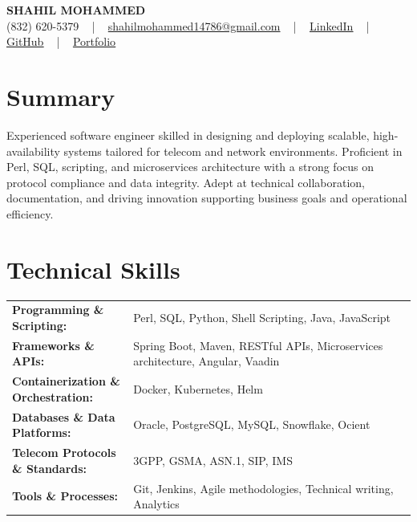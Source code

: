 \documentclass[letterpaper,11pt]{article}
\begin{document}
\begin{center}
    {\fontsize{14pt}{12pt}\selectfont \textbf{\MakeUppercase{Shahil Mohammed}}}\\ \vspace{2pt}
    \fontsize{10pt}{12pt}\selectfont (832) 620-5379 ~ | ~ \href{mailto:shahilmohammed14786@gmail.com}{shahilmohammed14786@gmail.com} ~ | ~  
    \href{https://www.linkedin.com/in/shahil-mohammed-9652931a1/}{\color{blue}\underline{LinkedIn}}  ~ | ~ 
    \href{https://github.com/freakbeast14}{\color{blue}\underline{GitHub}} ~ | ~ 
    \href{https://shahil-mohammed.netlify.app/}{\color{blue}\underline{Portfolio}}
    \vspace{-8pt}
\end{center}

\section{Summary}
\fontsize{9pt}{10pt}\selectfont
Experienced software engineer skilled in designing and deploying scalable, high-availability systems tailored for telecom and network environments. Proficient in Perl, SQL, scripting, and microservices architecture with a strong focus on protocol compliance and data integrity. Adept at technical collaboration, documentation, and driving innovation supporting business goals and operational efficiency.
 \vspace{-5pt}
 
\section{Technical Skills}
        \vspace{-14pt}
        \begin{table}[h]
            \fontsize{9pt}{10pt}\selectfont
            \begin{tabular}{p{0.3\linewidth} p{0.7\linewidth}}
                \textbf{Programming \& Scripting:} & Perl, SQL, Python, Shell Scripting, Java, JavaScript \\
                \textbf{Frameworks \& APIs:} & Spring Boot, Maven, RESTful APIs, Microservices architecture, Angular, Vaadin \\
                \textbf{Containerization \& Orchestration:} & Docker, Kubernetes, Helm \\
                \textbf{Databases \& Data Platforms:} & Oracle, PostgreSQL, MySQL, Snowflake, Ocient \\
                \textbf{Telecom Protocols \& Standards:} & 3GPP, GSMA, ASN.1, SIP, IMS \\
                \textbf{Tools \& Processes:} & Git, Jenkins, Agile methodologies, Technical writing, Analytics \\
            \end{tabular}
        \end{table}
 \vspace{-15pt}
 
\end{document}
